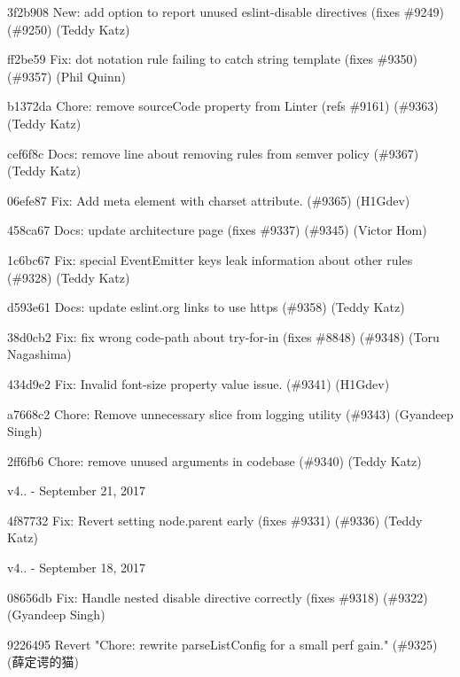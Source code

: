 \begin{DoxyItemize}
\item 3f2b908 New\+: add option to report unused eslint-\/disable directives (fixes \#9249) (\#9250) (Teddy Katz)
\item ff2be59 Fix\+: dot notation rule failing to catch string template (fixes \#9350) (\#9357) (Phil Quinn)
\item b1372da Chore\+: remove source\+Code property from Linter (refs \#9161) (\#9363) (Teddy Katz)
\item cef6f8c Docs\+: remove line about removing rules from semver policy (\#9367) (Teddy Katz)
\item 06efe87 Fix\+: Add meta element with charset attribute. (\#9365) (H1\+Gdev)
\item 458ca67 Docs\+: update architecture page (fixes \#9337) (\#9345) (Victor Hom)
\item 1c6bc67 Fix\+: special Event\+Emitter keys leak information about other rules (\#9328) (Teddy Katz)
\item d593e61 Docs\+: update eslint.\+org links to use https (\#9358) (Teddy Katz)
\item 38d0cb2 Fix\+: fix wrong code-\/path about try-\/for-\/in (fixes \#8848) (\#9348) (Toru Nagashima)
\item 434d9e2 Fix\+: Invalid font-\/size property value issue. (\#9341) (H1\+Gdev)
\item a7668c2 Chore\+: Remove unnecessary slice from logging utility (\#9343) (Gyandeep Singh)
\item 2ff6fb6 Chore\+: remove unused arguments in codebase (\#9340) (Teddy Katz)
\end{DoxyItemize}

v4.. -\/ September 21, 2017


\begin{DoxyItemize}
\item 4f87732 Fix\+: Revert setting node.\+parent early (fixes \#9331) (\#9336) (Teddy Katz)
\end{DoxyItemize}

v4.. -\/ September 18, 2017


\begin{DoxyItemize}
\item 08656db Fix\+: Handle nested disable directive correctly (fixes \#9318) (\#9322) (Gyandeep Singh)
\item 9226495 Revert "{}\+Chore\+: rewrite parse\+List\+Config for a small perf gain."{} (\#9325) (薛定谔的猫)
\end{DoxyItemize}

